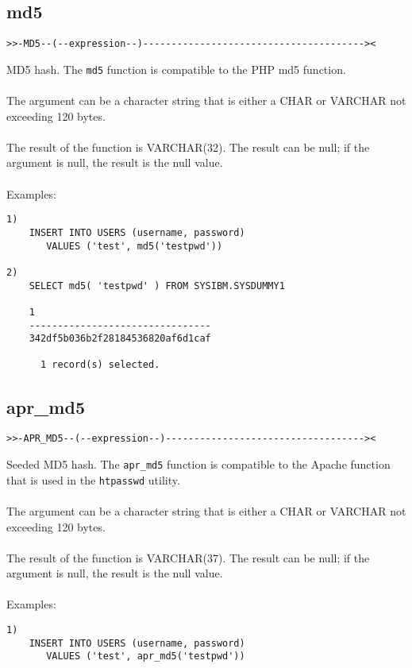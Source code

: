 \documentclass[11pt,a4paper]{article}
\begin{document}
\begin{appendix}
\subsection{md5} \label{md5}
\begin{verbatim}
>>-MD5--(--expression--)---------------------------------------><
\end{verbatim}
MD5 hash. The {\tt md5} function is compatible to the PHP md5 function.\\
\\
The argument can be a character string that is either a \mbox{CHAR} or \mbox{VARCHAR} not exceeding 120 bytes.\\
\\
The result of the function is VARCHAR(32). The result can be null; if the argument is null, the result is the null value.\\
\\
Examples:
\begin{verbatim}
1)
    INSERT INTO USERS (username, password)
       VALUES ('test', md5('testpwd'))

2)
    SELECT md5( 'testpwd' ) FROM SYSIBM.SYSDUMMY1

    1
    --------------------------------
    342df5b036b2f28184536820af6d1caf

      1 record(s) selected.
\end{verbatim}
\newpage
\hypertarget{haprmd5}{}
\subsection{apr\_md5} \label{aprmd5}
\begin{verbatim}
>>-APR_MD5--(--expression--)-----------------------------------><
\end{verbatim}
Seeded MD5 hash. The {\tt apr\_md5} function is compatible to the Apache function that is used in the {\tt htpasswd} utility.\\
\\
The argument can be a character string that is either a \mbox{CHAR} or \mbox{VARCHAR} not exceeding 120 bytes.\\
\\
The result of the function is VARCHAR(37). The result can be null; if the argument is null, the result is the null value.\\
\\
Examples:
\begin{verbatim}
1)
    INSERT INTO USERS (username, password)
       VALUES ('test', apr_md5('testpwd'))


\end{verbatim}
\end{appendix}
\end{document}

